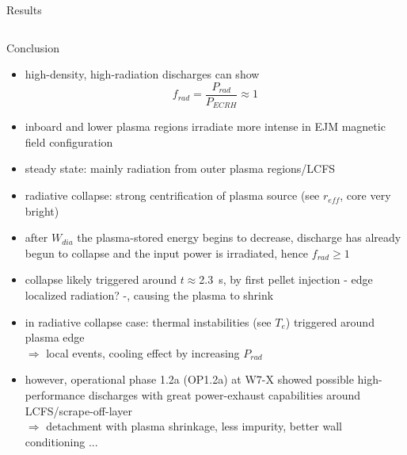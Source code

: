 \documentclass[final]{beamer}
\begin{document}
\begin{frame}
\begin{kasten}{\large Results}
\begin{columns}
\begin{kasten}{\small Conclusion}
\begin{itemize}
              \item{high-density, high-radiation discharges can show%
                $$f_{rad}=\frac{P_{rad}}{P_{ECRH}}\approx 1$$}%
              \item{inboard and lower plasma regions irradiate more intense %
                in EJM magnetic field configuration}
              \item{steady state: mainly radiation from outer plasma %
                regions/LCFS}
              \item{radiative collapse: strong centrification of plasma source %
                (see $r_{eff}$, core very bright)}
              \item{after $W_{dia}$ the plasma-stored energy begins to %
                decrease, discharge has already begun to collapse and %
                the input power is irradiated, hence $f_{rad}\ge 1$}
              \item{collapse likely triggered around $t\approx$\SI{2.3}{\second}, %
                by first pellet injection - edge localized radiation? -, %
                causing the plasma to shrink}
              \item{in radiative collapse case: thermal instabilities %
                (see $T_{e}$) triggered around plasma edge\\%
                $\Rightarrow$ local events, cooling effect by increasing %
                $P_{rad}$}
              \item{however, operational phase 1.2a (OP1.2a) at W7-X %
                showed possible high-performance discharges with great %
                power-exhaust capabilities around LCFS/scrape-off-layer\\%
                $\Rightarrow$ detachment with plasma shrinkage, less %
                impurity, better wall conditioning ...}
            \end{itemize}
          \vspace*{0.5cm}%
          \end{kasten}

\end{columns}
\end{kasten}
\end{frame}
\end{document}
